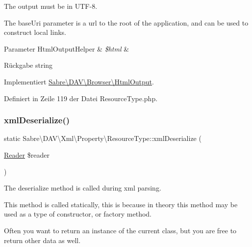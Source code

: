 The output must be in U\+T\+F-\/8.

The base\+Uri parameter is a url to the root of the application, and can be used to construct local links.


\begin{DoxyParams}[1]{Parameter}
Html\+Output\+Helper & {\em \$html} & \\
\hline
\end{DoxyParams}
\begin{DoxyReturn}{Rückgabe}
string 
\end{DoxyReturn}


Implementiert \mbox{\hyperlink{interface_sabre_1_1_d_a_v_1_1_browser_1_1_html_output_a53a24f82474cef8c1fcf00e87de3bf7c}{Sabre\textbackslash{}\+D\+A\+V\textbackslash{}\+Browser\textbackslash{}\+Html\+Output}}.



Definiert in Zeile 119 der Datei Resource\+Type.\+php.

\mbox{\label{class_sabre_1_1_d_a_v_1_1_xml_1_1_property_1_1_resource_type_adef04ac0175c27977f6b038768537835}} 
\subsubsection{\texorpdfstring{xml\+Deserialize()}{xmlDeserialize()}}
{\footnotesize\ttfamily static Sabre\textbackslash{}\+D\+A\+V\textbackslash{}\+Xml\textbackslash{}\+Property\textbackslash{}\+Resource\+Type\+::xml\+Deserialize (\begin{DoxyParamCaption}\item[{\mbox{\hyperlink{class_sabre_1_1_xml_1_1_reader}{Reader}}}]{\$reader }\end{DoxyParamCaption})\hspace{0.3cm}{\ttfamily [static]}}

The deserialize method is called during xml parsing.

This method is called statically, this is because in theory this method may be used as a type of constructor, or factory method.

Often you want to return an instance of the current class, but you are free to return other data as well.

